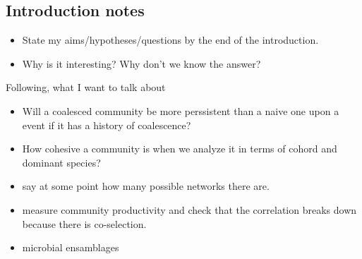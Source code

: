 \documentclass[titlepage,11pt]{article}
\begin{document}
	\begin{linenumbers}
		\section{Introduction notes} 
			\begin{itemize}
				\item State my aims/hypotheses/questions by the end of the introduction.
				\item Why is it interesting? Why don't we know the answer?
				
			\end{itemize}
			Following, what I want to talk about
			\begin{itemize}

				\item Will a coalesced community be more perssistent than a naive one upon a  event if it has a history of coalescence?
				\item How cohesive a community is when we analyze it in terms of cohord and dominant species? 
				\item say at some point how many possible networks there are.
				\item measure community productivity and check that the correlation breaks down because there is co-selection.
				\item microbial ensamblages
				
			\end{itemize}
		\newpage
		\begin{singlespace}

\end{singlespace}
\end{linenumbers}
\end{document}
